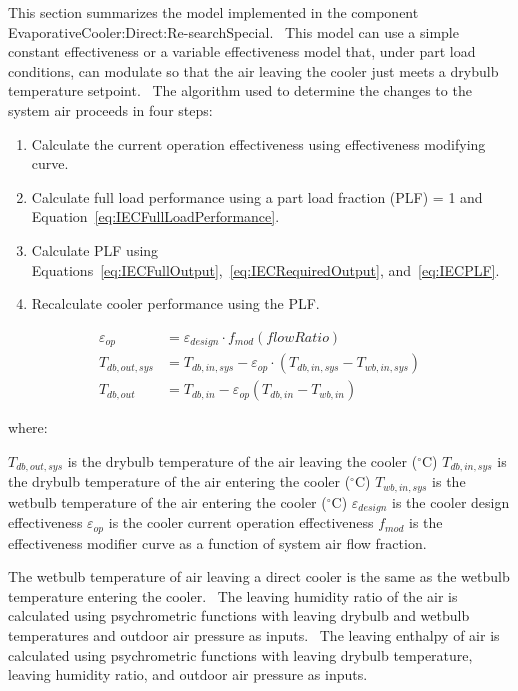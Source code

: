 This section summarizes the model implemented in the component EvaporativeCooler:Direct:Re-searchSpecial.~ This model can use a simple constant effectiveness or a variable effectiveness model that, under part load conditions, can modulate so that the air leaving the cooler just meets a drybulb temperature setpoint.~ The algorithm used to determine the changes to the system air proceeds in four steps:

\begin{enumerate}
\item Calculate the current operation effectiveness using effectiveness modifying curve.
\item Calculate full load performance using a part load fraction (PLF) = 1 and Equation~\ref{eq:IECFullLoadPerformance}.
\item Calculate PLF using Equations~\ref{eq:IECFullOutput},~\ref{eq:IECRequiredOutput}, and~\ref{eq:IECPLF}.
\item Recalculate cooler performance using the PLF.
\end{enumerate}


\begin{equation}
 \begin{array}{rl}
  \varepsilon_{op} & = \varepsilon_{design}\cdot f_{mod}\left(flowRatio\right) \\
  T_{db,out,sys} & = T_{db,in,sys} - \varepsilon_{op}\cdot\left(T_{db,in,sys}-T_{wb,in,sys}\right) \\
  T_{db,out} & = T_{db,in}-\varepsilon_{op}\left(T_{db,in}-T_{wb,in}\right)
 \end{array}
\label{eq:IECFullLoadPerformance}
\end{equation}

where:

\({T_{db,out,sys}}\) is the drybulb temperature of the air leaving the cooler (\(^{\circ}\)C)
\({T_{db,in,sys}}\) is the drybulb temperature of the air entering the cooler (\(^{\circ}\)C)
\({T_{wb,in,sys}}\) is the wetbulb temperature of the air entering the cooler (\(^{\circ}\)C)
\(\varepsilon_{design}\) is the cooler design effectiveness
\(\varepsilon_{op}\) is the cooler current operation effectiveness
\(f_{mod}\) is the effectiveness modifier curve as a function of system air flow fraction.

The wetbulb temperature of air leaving a direct cooler is the same as the wetbulb temperature entering the cooler.~ The leaving humidity ratio of the air is calculated using psychrometric functions with leaving drybulb and wetbulb temperatures and outdoor air pressure as inputs.~ The leaving enthalpy of air is calculated using psychrometric functions with leaving drybulb temperature, leaving humidity ratio, and outdoor air pressure as inputs.


